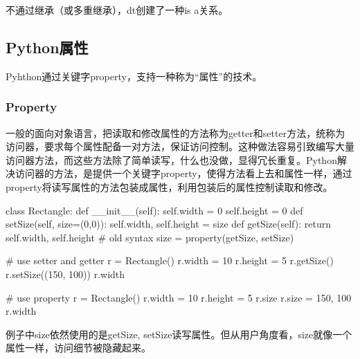 



不通过继承（或多重继承），dt创建了一种is a关系。

\subsection{Python属性}
Pyhthon通过关键字property，支持一种称为“属性”的技术。
\subsubsection{Property}
一般的面向对象语言，把读取和修改属性的方法称为getter和setter方法，统称为访问器，要求每个属性配备一对方法，保证访问控制。这种做法容易引致编写大量访问器方法，而这些方法除了简单读写，什么也没做，显得冗长重复。Python解决访问器的方法，是提供一个关键字property，使得方法看上去和属性一样，通过property将读写属性的方法包装成属性，利用包装后的属性控制读取和修改。
\begin{python}
class Rectangle:
    def __init__(self):
        self.width = 0
        self.height = 0
    def setSize(self, size=(0,0)):
        self.width, self.height = size
    def getSize(self):
        return self.width, self.height
# old syntax
    size = property(getSize, setSize)

# use setter and getter
r = Rectangle()
r.width = 10
r.height = 5
r.getSize()
r.setSize((150, 100))
r.width

# use property
r = Rectangle()
r.width = 10
r.height = 5
r.size
r.size = 150, 100
r.width
\end{python}
例子中size依然使用的是getSize, setSize读写属性。但从用户角度看，size就像一个属性一样，访问细节被隐藏起来。

